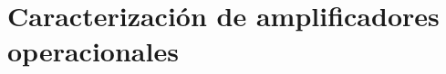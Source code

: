 \documentclass[../../main.tex]{subfiles}
\begin{document}
\section{Caracterizaci\'on de amplificadores operacionales}
\end{document}
